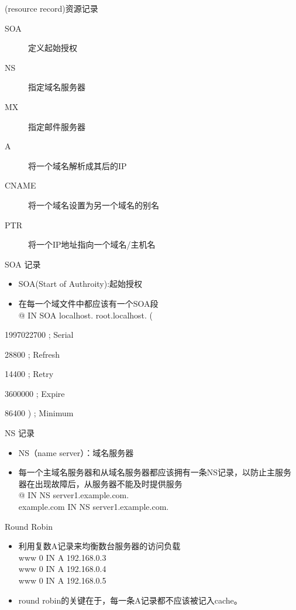 \begin{frame}{(resource record)资源记录}
\begin{description}
\item [{SOA}] 定义起始授权
\item [{NS}] 指定域名服务器
\item [{MX}] 指定邮件服务器
\item [{A}] 将一个域名解析成其后的IP
\item [{CNAME}] 将一个域名设置为另一个域名的别名
\item [{PTR}] 将一个IP地址指向一个域名/主机名
\end{description}

\end{frame} 
\begin{frame}{SOA 记录}


\begin{itemize}
\item SOA(Start of Authroity):起始授权
\item 在每一个域文件中都应该有一个SOA段\\
@       IN      SOA     localhost. root.localhost.  (
\end{itemize}
                                      1997022700 ; Serial

                                      28800      ; Refresh

                                     14400      ; Retry

                                      3600000    ; Expire

                                      86400 )    ; Minimum


\end{frame} 
\begin{frame}{NS 记录}


\begin{itemize}
\item NS（name server）：域名服务器
\item 每一个主域名服务器和从域名服务器都应该拥有一条NS记录，以防止主服务器在出现故障后，从服务器不能及时提供服务\\
@			IN    	NS	server1.example.com.\\
example.com	IN	NS	server1.example.com.
\end{itemize}

\end{frame} 
\begin{frame}{Round Robin}
\begin{itemize}
\item 利用复数A记录来均衡数台服务器的访问负载 \\
www 0 IN A 192.168.0.3\\
www 0 IN A 192.168.0.4\\
www 0 IN A 192.168.0.5
\item round robin的关键在于，每一条A记录都不应该被记入cache。 
\end{itemize}

\end{frame} 
